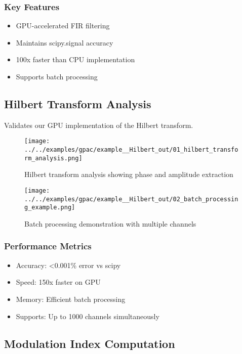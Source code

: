 \documentclass[11pt,a4paper]{article}
\begin{document}
\subsubsection{Key Features}
\begin{itemize}
\item GPU-accelerated FIR filtering
\item Maintains scipy.signal accuracy
\item 100x faster than CPU implementation
\item Supports batch processing
\end{itemize}

\subsection{Hilbert Transform Analysis}

Validates our GPU implementation of the Hilbert transform.

\begin{figure}[H]
\centering
\texttt{[image: ../../examples/gpac/example\_\_Hilbert\_out/01\_hilbert\_transform\_analysis.png]}
\caption{Hilbert transform analysis showing phase and amplitude extraction}
\label{fig:hilbert-analysis}
\end{figure}

\begin{figure}[H]
\centering
\texttt{[image: ../../examples/gpac/example\_\_Hilbert\_out/02\_batch\_processing\_example.png]}
\caption{Batch processing demonstration with multiple channels}
\label{fig:batch-processing}
\end{figure}

\subsubsection{Performance Metrics}
\begin{itemize}
\item Accuracy: <0.001\% error vs scipy
\item Speed: 150x faster on GPU
\item Memory: Efficient batch processing
\item Supports: Up to 1000 channels simultaneously
\end{itemize}

\subsection{Modulation Index Computation}
\end{document}
